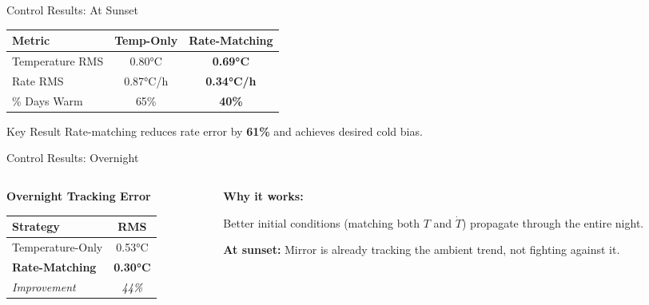 \documentclass[aspectratio=169,11pt]{beamer}
\begin{document}
\begin{frame}{Control Results: At Sunset}

\centering
\begin{tabular}{l|cc}
\toprule
\textbf{Metric} & \textbf{Temp-Only} & \textbf{Rate-Matching} \\
\midrule
Temperature RMS & 0.80°C & \textbf{0.69°C} \\
Rate RMS & 0.87°C/h & \textbf{0.34°C/h} \\
\% Days Warm & 65\% & \textbf{40\%} \\
\bottomrule
\end{tabular}

\vspace{1em}

\begin{alertblock}{Key Result}
Rate-matching reduces rate error by \textbf{61\%} and achieves desired cold bias.
\end{alertblock}

\end{frame}

\begin{frame}{Control Results: Overnight}

\begin{columns}
\begin{column}{0.5\textwidth}
\centering
\textbf{Overnight Tracking Error}

\vspace{0.5em}

\begin{tabular}{l|c}
\toprule
\textbf{Strategy} & \textbf{RMS} \\
\midrule
Temperature-Only & 0.53°C \\
\textbf{Rate-Matching} & \textbf{0.30°C} \\
\midrule
\textit{Improvement} & \textit{44\%} \\
\bottomrule
\end{tabular}
\end{column}

\begin{column}{0.5\textwidth}
\textbf{Why it works:}

\vspace{0.5em}

Better initial conditions (matching both $T$ and $\dot{T}$) propagate through the entire night.

\vspace{1em}

\textbf{At sunset:} Mirror is already tracking the ambient trend, not fighting against it.
\end{column}
\end{columns}

\end{frame}
\end{document}
